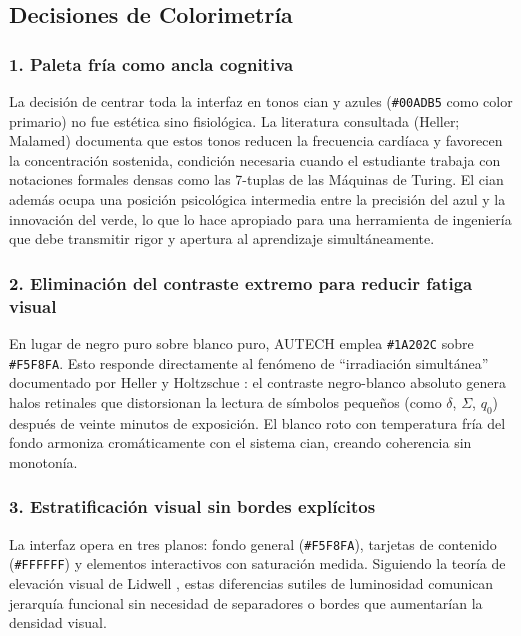\newpage
\subsection{Decisiones de Colorimetría}
\label{subsec:colorimetria}

\subsubsection*{1. Paleta fría como ancla cognitiva}

La decisión de centrar toda la interfaz en tonos cian y azules (\texttt{\#00ADB5} como color
primario) no fue estética sino fisiológica. La literatura consultada (Heller; Malamed)
\cite{heller2004}\cite{malamed2015} documenta que estos tonos reducen la frecuencia cardíaca y
favorecen la concentración sostenida, condición necesaria cuando el estudiante trabaja con
notaciones formales densas como las 7-tuplas de las Máquinas de Turing. El cian además ocupa una
posición psicológica intermedia entre la precisión del azul y la innovación del verde, lo que lo
hace apropiado para una herramienta de ingeniería que debe transmitir rigor y apertura al
aprendizaje simultáneamente.

\subsubsection*{2. Eliminación del contraste extremo para reducir fatiga visual}

En lugar de negro puro sobre blanco puro, AUTECH emplea \texttt{\#1A202C} sobre
\texttt{\#F5F8FA}. Esto responde directamente al fenómeno de ``irradiación simultánea'' documentado
por Heller y Holtzschue \cite{heller2004}\cite{holtzschue2017}: el contraste negro-blanco absoluto
genera halos retinales que distorsionan la lectura de símbolos pequeños (como $\delta$, $\Sigma$,
$q_0$) después de veinte minutos de exposición. El blanco roto con temperatura fría del fondo
armoniza cromáticamente con el sistema cian, creando coherencia sin monotonía.

\subsubsection*{3. Estratificación visual sin bordes explícitos}

La interfaz opera en tres planos: fondo general (\texttt{\#F5F8FA}), tarjetas de contenido
(\texttt{\#FFFFFF}) y elementos interactivos con saturación medida. Siguiendo la teoría de
elevación visual de Lidwell \cite{lidwell2010}, estas diferencias sutiles de luminosidad comunican
jerarquía funcional sin necesidad de separadores o bordes que aumentarían la densidad visual.

